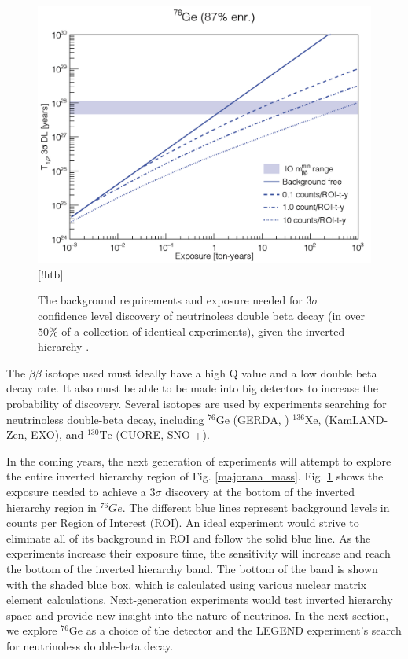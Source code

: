 \begin{figure}
\centering
\includegraphics[width=0.8\linewidth]{ch1/figs/exposure_plot.png}[!htb]
\caption{The background requirements and exposure needed for 3$\sigma$ confidence level discovery of neutrinoless double beta decay (in over $50\%$ of a collection of identical experiments), given the inverted hierarchy \cite{Gruszko:2017kfx}.}
\label{exposure_plot}
\end{figure}

The $\beta\beta$ isotope used must ideally have a high Q value and a low double beta decay rate. It also must be able to be made into big detectors to increase the probability of discovery. Several isotopes are used by experiments searching for neutrinoless double-beta decay, including ${}^{76}\mathrm{Ge}$ (GERDA\cite{GERDA_final}, {\MJD}\cite{mjd2013}) ${}^{136}\mathrm{Xe}$, (KamLAND-Zen\cite{KamLANDZen2018}, EXO\cite{Auger2012ar}), and ${}^{130}\mathrm{Te}$ (CUORE\cite{Arnaboldi2002du}, SNO +\cite{SNO_paper}). 


In the coming years, the next generation of experiments will attempt to explore the entire inverted hierarchy region of Fig. \ref{majorana_mass}. Fig. \ref{exposure_plot} shows the exposure needed to achieve a $3\sigma$ discovery at the bottom of the inverted hierarchy region in ${}^{76}Ge$. The different blue lines represent background levels in counts per Region of Interest (ROI). An ideal experiment would strive to eliminate all of its background in ROI and follow the solid blue line. As the experiments increase their exposure time, the sensitivity will increase and reach the bottom of the inverted hierarchy band. The bottom of the band is shown with the shaded blue box, which is calculated using various nuclear matrix element calculations. Next-generation experiments would test inverted hierarchy space and provide new insight into the nature of neutrinos. In the next section, we explore ${}^{76}\mathrm{Ge}$ as a choice of the detector and the LEGEND experiment's search for neutrinoless double-beta decay.

